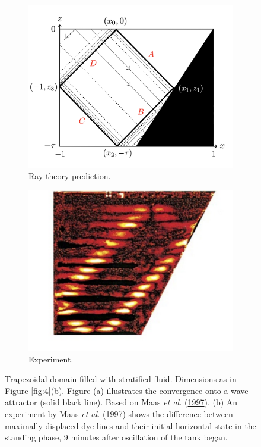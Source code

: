 \documentclass[a4paper]{article}
\numberwithin{equation}{section}
\begin{document}
\begin{figure}[h!]
\centering
\begin{subfigure}[t]{.5\textwidth}
  \centering
  \includegraphics[width=1\linewidth]{Images/iwa diagram.jpeg}
  \caption{Ray theory prediction.}
  \label{fig:sub1}
\end{subfigure}%
\begin{subfigure}[t]{.5\textwidth}
  \centering
  \includegraphics[width=0.875\linewidth]{Images/iwa experiment}
  \caption{Experiment.}
  \label{fig:sub2}
\end{subfigure}
\caption{Trapezoidal domain filled with stratified fluid. Dimensions as in Figure \protect\ref{fig:4}(b). Figure (a) illustrates the convergence onto a wave attractor (solid black line). Based on Maas \emph{et al.} (\protect\hyperlink{ref 11}{1997}). (b) An experiment by Maas \emph{et al.} (\protect\hyperlink{ref 11}{1997}) shows the difference between maximally displaced dye lines and their initial horizontal state in the standing phase, 9 minutes after oscillation of the tank began.}
\label{fig:5}
\end{figure}\\
\end{document}
